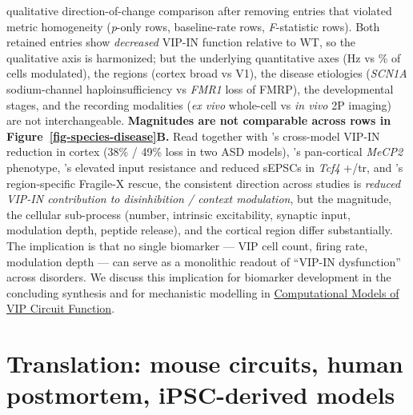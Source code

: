 \documentclass[11pt]{article}
\begin{document}
qualitative direction-of-change comparison after removing entries that
violated metric homogeneity (\textit{p}-only rows, baseline-rate rows, \textit{F}-statistic
rows). Both retained entries show \textit{decreased} VIP-IN function relative to
WT, so the qualitative axis is harmonized; but the underlying
quantitative axes (Hz vs \% of cells modulated), the regions (cortex broad
vs V1), the disease etiologies (\textit{SCN1A} sodium-channel haploinsufficiency
vs \textit{FMR1} loss of FMRP), the developmental stages, and the recording
modalities (\textit{ex vivo} whole-cell vs \textit{in vivo} 2P imaging) are not
interchangeable. \textbf{Magnitudes are not comparable across rows in
Figure~\ref{fig-species-disease}B.} Read together with \citet{Hanno2026}'s
cross-model VIP-IN reduction in cortex (38\% / 49\% loss in two ASD models),
\citet{Mossner2020}'s pan-cortical \textit{MeCP2} phenotype,
\citet{Chen2023b}'s elevated input resistance and reduced sEPSCs in
\textit{Tcf4} +/tr, and \citet{Bhandari2024}'s region-specific Fragile-X
rescue, the consistent direction across studies is \textit{reduced VIP-IN
contribution to disinhibition / context modulation}, but the magnitude,
the cellular sub-process (number, intrinsic excitability, synaptic input,
modulation depth, peptide release), and the cortical region differ
substantially. The implication is that no single biomarker --- VIP cell
count, firing rate, modulation depth --- can serve as a monolithic readout
of ``VIP-IN dysfunction'' across disorders. We discuss this implication
for biomarker development in the concluding synthesis and for
mechanistic modelling in \href{/computational-models}{Computational Models of VIP Circuit Function}.

\section{Translation: mouse circuits, human postmortem, iPSC-derived models}
\end{document}
